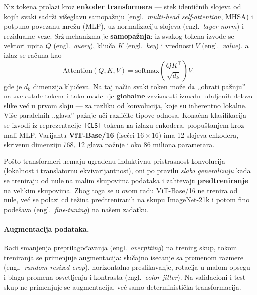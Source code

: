 \documentclass[12pt,a4paper]{article}
\begin{document}
Niz tokena prolazi kroz \textbf{enkoder transformera} --- stek identičnih slojeva od kojih
svaki sadrži višeglavu samopažnju (engl.\ \textit{multi-head self-attention}, MHSA) i
potpuno povezanu mrežu (MLP), uz normalizaciju slojeva (engl.\ \textit{layer norm}) i
rezidualne veze. Srž mehanizma je \textbf{samopažnja}: iz svakog tokena izvode se vektori
upita $Q$ (engl.\ \textit{query}), ključa $K$ (engl.\ \textit{key}) i vrednosti $V$
(engl.\ \textit{value}), a izlaz se računa kao
\begin{equation}
\mathrm{Attention}(Q,K,V) = \mathrm{softmax}\!\left(\frac{QK^{\top}}{\sqrt{d_k}}\right)V,
\label{eq:attention}
\end{equation}
gde je $d_k$ dimenzija ključeva. Na taj način svaki token može da ,,obrati pažnju'' na sve
ostale tokene i tako modeluje \textbf{globalne} zavisnosti između udaljenih delova slike
već u prvom sloju --- za razliku od konvolucija, koje su inherentno lokalne. Više
paralelnih ,,glava'' pažnje uči različite tipove odnosa. Konačna klasifikacija se izvodi iz
reprezentacije \texttt{[CLS]} tokena na izlazu enkodera, propuštanjem kroz mali MLP.
Varijanta \textbf{ViT-Base/16} (isečci $16\times16$) ima 12 slojeva enkodera, skrivenu
dimenziju 768, 12 glava pažnje i oko 86 miliona parametara.

Pošto transformeri nemaju ugrađenu induktivnu pristrasnost konvolucija (lokalnost i
translatornu ekvivarijantnost), oni po pravilu \textit{slabo generalizuju} kada se treniraju
od nule na malim skupovima podataka i zahtevaju \textbf{predtreniranje} na velikim skupovima.
Zbog toga se u ovom radu ViT-Base/16 ne trenira od nule, već se polazi od težina
predtreniranih na skupu ImageNet-21k i potom fino podešava (engl.\ \textit{fine-tuning}) na
našem zadatku.

\paragraph{Augmentacija podataka.}
Radi smanjenja preprilagođavanja (engl.\ \textit{overfitting}) na trening skup, tokom
treniranja se primenjuje augmentacija: slučajno isecanje sa promenom razmere (engl.\
\textit{random resized crop}), horizontalno preslikavanje, rotacija u malom opsegu i
blaga promena osvetljenja i kontrasta (engl.\ \textit{color jitter}). Na validacioni i
test skup ne primenjuje se augmentacija, već samo deterministička transformacija.
\end{document}

